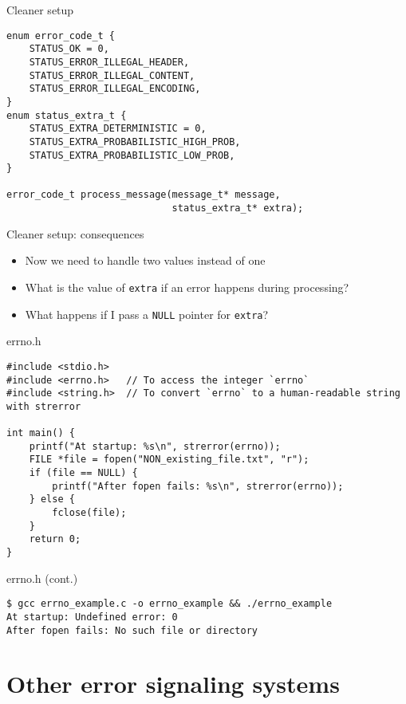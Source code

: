 \documentclass[aspectratio=169,14pt]{beamer}
\begin{document}
\begin{frame}[fragile]{Cleaner setup}
\begin{lstlisting}[style=cstyle]
enum error_code_t {
    STATUS_OK = 0,
    STATUS_ERROR_ILLEGAL_HEADER,
    STATUS_ERROR_ILLEGAL_CONTENT,
    STATUS_ERROR_ILLEGAL_ENCODING,
}
enum status_extra_t {
    STATUS_EXTRA_DETERMINISTIC = 0,
    STATUS_EXTRA_PROBABILISTIC_HIGH_PROB,
    STATUS_EXTRA_PROBABILISTIC_LOW_PROB,
}

error_code_t process_message(message_t* message,
                             status_extra_t* extra);
\end{lstlisting}
\end{frame}


\begin{frame}[fragile]{Cleaner setup: consequences}
    \begin{itemize}
        \item Now we need to handle two values instead of one
        \item What is the value of \texttt{extra} if an error happens during processing?
        \item What happens if I pass a \texttt{NULL} pointer for \texttt{extra}?
    \end{itemize}
\end{frame}


\begin{frame}[fragile]{errno.h}
\begin{lstlisting}[style=cstyle]
#include <stdio.h>
#include <errno.h>   // To access the integer `errno`
#include <string.h>  // To convert `errno` to a human-readable string with strerror

int main() {
    printf("At startup: %s\n", strerror(errno));
    FILE *file = fopen("NON_existing_file.txt", "r");
    if (file == NULL) {
        printf("After fopen fails: %s\n", strerror(errno));
    } else {
        fclose(file);
    }
    return 0;
}
\end{lstlisting}
\end{frame}

\begin{frame}[fragile]{errno.h (cont.)}
\begin{lstlisting}[style=nostyle]
$ gcc errno_example.c -o errno_example && ./errno_example
At startup: Undefined error: 0
After fopen fails: No such file or directory
\end{lstlisting}
\end{frame}


\section{Other error signaling systems}
\end{document}
